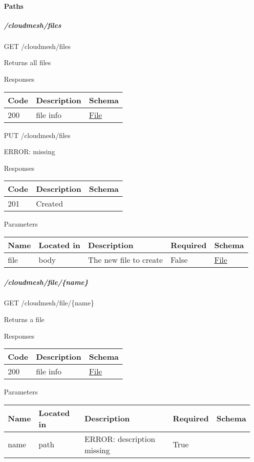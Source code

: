 \documentclass[9pt,]{article}
\let\oldparagraph\paragraph
\renewcommand{\paragraph}[1]{\oldparagraph{#1}\mbox{}}
\let\oldsubparagraph\subparagraph
\renewcommand{\subparagraph}[1]{\oldsubparagraph{#1}\mbox{}}
\begin{document}
\hypertarget{paths-9}{%
\paragraph{Paths}\label{paths-9}}

\hypertarget{cloudmeshfiles}{%
\subparagraph{/cloudmesh/files}\label{cloudmeshfiles}}

GET /cloudmesh/files

Returns all files

Responses

\begin{longtable}[]{@{}lll@{}}
\toprule
Code & Description & Schema\tabularnewline
\midrule
\endhead
200 & file info & \protect\hyperlink{file}{File}\tabularnewline
\bottomrule
\end{longtable}

PUT /cloudmesh/files

ERROR: missing

Responses

\begin{longtable}[]{@{}lll@{}}
\toprule
Code & Description & Schema\tabularnewline
\midrule
\endhead
201 & Created &\tabularnewline
\bottomrule
\end{longtable}

Parameters

\begin{longtable}[]{@{}lllll@{}}
\toprule
Name & Located in & Description & Required & Schema\tabularnewline
\midrule
\endhead
file & body & The new file to create & False &
\protect\hyperlink{file}{File}\tabularnewline
\bottomrule
\end{longtable}

\hypertarget{cloudmeshfilename}{%
\subparagraph{/cloudmesh/file/\{name\}}\label{cloudmeshfilename}}

GET /cloudmesh/file/\{name\}

Returns a file

Responses

\begin{longtable}[]{@{}lll@{}}
\toprule
Code & Description & Schema\tabularnewline
\midrule
\endhead
200 & file info & \protect\hyperlink{file}{File}\tabularnewline
\bottomrule
\end{longtable}

Parameters

\begin{longtable}[]{@{}lllll@{}}
\toprule
Name & Located in & Description & Required & Schema\tabularnewline
\midrule
\endhead
name & path & ERROR: description missing & True &\tabularnewline
\bottomrule
\end{longtable}
\end{document}
